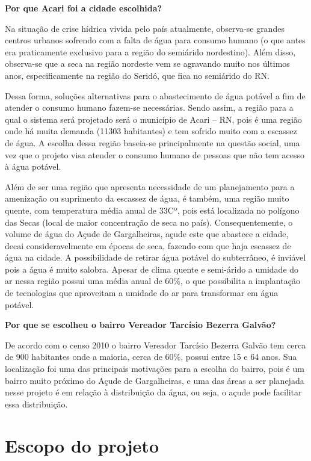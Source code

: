 \textbf{Por que  Acari foi a cidade escolhida?}

Na situação de crise hídrica vivida pelo país atualmente, observa-se grandes centros urbanos sofrendo com a falta de água
para consumo humano (o que antes era praticamente exclusivo para a região do semiárido nordestino). Além disso, observa-se que
a seca na região nordeste vem se agravando muito nos últimos anos, especificamente na região do Seridó, que fica no semiárido do RN.

Dessa forma, soluções alternativas para o abastecimento de água potável a fim de atender o consumo humano fazem-se necessárias. 
Sendo assim, a região para a qual o sistema será projetado será o município de Acari – RN, pois é uma região onde há muita
demanda (11303 habitantes) e tem sofrido muito com a escassez de água. A escolha dessa região baseia-se principalmente na 
questão social, uma vez que o projeto visa atender o consumo humano de pessoas que não tem acesso à água potável.

Além de ser uma região que apresenta necessidade de um planejamento para a amenização ou suprimento da escassez de água, é 
também, uma região muito quente, com temperatura média anual de 33Cº, pois está localizada no polígono das Secas 
(local de maior concentração de seca no país). Consequentemente, o volume de água do Açude de Gargalheiras, açude este que
abastece a cidade, decai consideravelmente em épocas de seca, fazendo com que haja escassez de água na cidade. A possibilidade
de retirar água potável do subterrâneo, é inviável pois a água é muito salobra. Apesar de clima quente e semi-árido a umidade
do ar nessa região  possui uma média anual de 60\%, o que possibilita a implantação de tecnologias que aproveitam a umidade do ar
para transformar em água potável.

\textbf{Por que se escolheu o bairro Vereador Tarcísio Bezerra Galvão?}

De acordo com o censo 2010 o bairro Vereador Tarcísio Bezerra Galvão tem cerca de 900 habitantes onde a maioria, cerca de 60\%,
possui entre 15 e 64 anos. Sua localização foi uma das principais motivações para a escolha do bairro, pois é um bairro muito
próximo do Açude de Gargalheiras, e uma das áreas a ser planejada nesse projeto é em relação à distribuição da água, ou seja,
o açude pode facilitar essa distribuição.

\section{Escopo do projeto}

